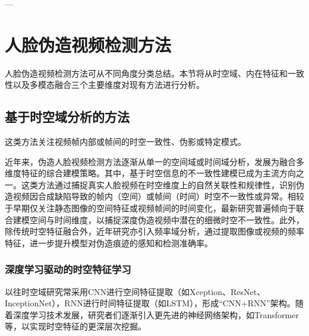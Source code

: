 \documentclass[conference]{IEEEtran}
\begin{document}
---

\section{人脸伪造视频检测方法}
人脸伪造视频检测方法可从不同角度分类总结。本节将从时空域、内在特征和一致性以及多模态融合三个主要维度对现有方法进行分析。

\subsection{基于时空域分析的方法}
这类方法关注视频帧内部或帧间的时空一致性、伪影或特定模式。

近年来，伪造人脸视频检测方法逐渐从单一的空间域或时间域分析，发展为融合多维度特征的综合建模策略。其中，基于时空信息的不一致性建模已成为主流方向之一。这类方法通过捕捉真实人脸视频在时空维度上的自然关联性和规律性，识别伪造视频因合成缺陷导致的帧内（空间）或帧间（时间）时空不一致性或异常。相较于早期仅关注静态图像的空间特征或视频帧间的时间变化，最新研究普遍倾向于联合建模空间与时间维度，以捕捉深度伪造视频中潜在的细微时空不一致性。此外，除传统时空特征融合外，近年研究亦引入频率域分析，通过提取图像或视频的频率特征，进一步提升模型对伪造痕迹的感知和检测准确率。

\subsubsection{深度学习驱动的时空特征学习}
以往时空域研究常采用CNN进行空间特征提取（如Xception\cite{F.-421}、ResNet\cite{K.X.-422}、InceptionNet\cite{C.Wei-423}），RNN进行时间特征提取（如LSTM\cite{S.J.-424}），形成“CNN+RNN”架构。随着深度学习技术发展，研究者们逐渐引入更先进的神经网络架构，如Transformer等，以实现时空特征的更深层次挖掘。
\end{document}
